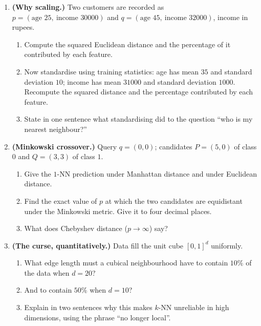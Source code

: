 \documentclass[11pt]{article}
\begin{document}
\begin{enumerate}[leftmargin=*, itemsep=0.55em]
\item \textbf{(Why scaling.)} Two customers are recorded as
  $p = (\text{age }25,\ \text{income }30000)$ and
  $q = (\text{age }45,\ \text{income }32000)$, income in rupees.
  \begin{enumerate}[label=(\alph*)]
    \item Compute the squared Euclidean distance and the percentage of it
      contributed by each feature.
    \item Now standardise using training statistics: age has mean $35$ and
      standard deviation $10$; income has mean $31000$ and standard deviation
      $1000$. Recompute the squared distance and the percentage contributed by
      each feature.
    \item State in one sentence what standardising did to the question ``who
      is my nearest neighbour?''
  \end{enumerate}

\item \textbf{(Minkowski crossover.)} Query $q = (0,0)$; candidates
  $P = (5, 0)$ of class $0$ and $Q = (3, 3)$ of class $1$.
  \begin{enumerate}[label=(\alph*)]
    \item Give the $1$-NN prediction under Manhattan distance and under
      Euclidean distance.
    \item Find the exact value of $p$ at which the two candidates are
      equidistant under the Minkowski metric. Give it to four decimal places.
    \item What does Chebyshev distance ($p \to \infty$) say?
  \end{enumerate}

\item \textbf{(The curse, quantitatively.)} Data fill the unit cube
  $[0,1]^d$ uniformly.
  \begin{enumerate}[label=(\alph*)]
    \item What edge length must a cubical neighbourhood have to contain
      $10\%$ of the data when $d = 20$?
    \item And to contain $50\%$ when $d = 10$?
    \item Explain in two sentences why this makes $k$-NN unreliable in high
      dimensions, using the phrase ``no longer local''.
  \end{enumerate}


\end{enumerate}
\end{document}
